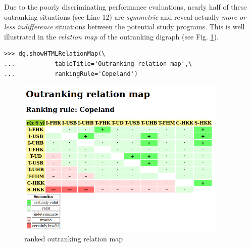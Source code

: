 Due to the poorly discriminating performance evaluations, nearly half of these outranking situations (see Line 12) are \emph{symmetric} and reveal actually \emph{more or less indifference} situations between the potential study programs. This is well illustrated in the \emph{relation map} of the outranking digraph (see Fig. \ref{fig:12.4}).
\begin{lstlisting}
>>> dg.showHTMLRelationMap(\
...           tableTitle='Outranking relation map',\
...           rankingRule='Copeland')
\end{lstlisting}
\begin{figure}[h]
\includegraphics[width=10cm]{Figures/aliceRelationmap.png}
\caption{\Copeland ranked outranking relation map}
\label{fig:12.4}       %
\end{figure}

